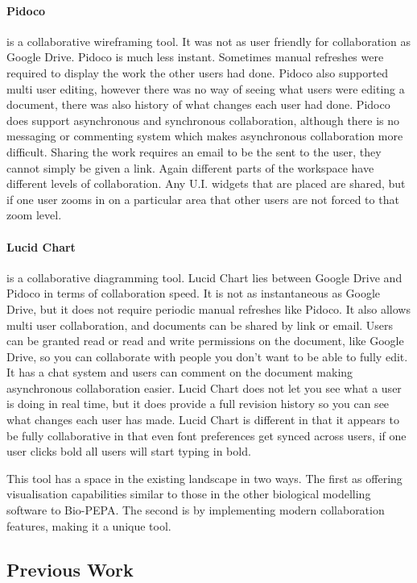 \paragraph{Pidoco} is a collaborative wireframing tool.  It was not as user friendly for collaboration as Google Drive.  Pidoco is much less instant.  Sometimes manual refreshes were required to display the work the other users had done.  Pidoco also supported multi user editing, however there was no way of seeing what users were editing a document, there was also history of what changes each user had done.  Pidoco does support asynchronous and synchronous collaboration, although there is no messaging or commenting system which makes asynchronous collaboration more difficult.  Sharing the work requires an email to be the sent to the user, they cannot simply be given a link.  Again different parts of the workspace have different levels of collaboration.  Any U.I. widgets that are placed are shared, but if one user zooms in on a particular area that other users are not forced to that zoom level.

\paragraph{Lucid Chart} is a collaborative diagramming tool.  Lucid Chart lies between Google Drive and Pidoco in terms of collaboration speed.  It is not as instantaneous as Google Drive, but it does not require periodic manual refreshes like Pidoco.  It also allows multi user collaboration, and documents can be shared by link or email.  Users can be granted read or read and write permissions on the document, like Google Drive, so you can collaborate with people you don't want to be able to fully edit.  It has a chat system and users can comment on the document making asynchronous collaboration easier.  Lucid Chart does not let you see what a user is doing in real time, but it does provide a full revision history so you can see what changes each user has made.  Lucid Chart is different in that it appears to be fully collaborative in that even font preferences get synced across users, if one user clicks bold all users will start typing in bold.

This tool has a space in the existing landscape in two ways.  The first as offering visualisation capabilities similar to those in the other biological modelling software to Bio-PEPA.  The second is by implementing modern collaboration features, making it a unique tool.

\subsection{Previous Work}

